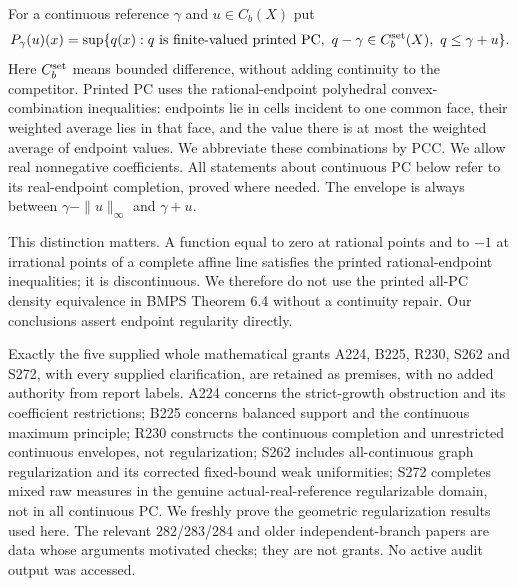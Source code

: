 \documentclass[11pt]{article}
\theoremstyle{definition}\newtheorem{definition}[theorem]{Definition}
\theoremstyle{remark}\newtheorem{remark}[theorem]{Remark}
\begin{document}
For a continuous reference $\gamma$ and $u\in C_b(X)$ put
\[
 P_\gamma(u)(x)=\sup\{q(x):q\text{ is finite-valued printed PC},\ q-\gamma\in C_b^{\rm set}(X),\ q\leq\gamma+u\}.
\]
Here $C_b^{\rm set}$ means bounded difference, without adding continuity to the competitor. Printed PC uses the rational-endpoint polyhedral convex-combination inequalities: endpoints lie in cells incident to one common face, their weighted average lies in that face, and the value there is at most the weighted average of endpoint values. We abbreviate these combinations by PCC. We allow real nonnegative coefficients. All statements about continuous PC below refer to its real-endpoint completion, proved where needed. The envelope is always between $\gamma-\|u\|_\infty$ and $\gamma+u$.

This distinction matters. A function equal to zero at rational points and to $-1$ at irrational points of a complete affine line satisfies the printed rational-endpoint inequalities; it is discontinuous. We therefore do not use the printed all-PC density equivalence in BMPS Theorem 6.4 without a continuity repair. Our conclusions assert endpoint regularity directly.

Exactly the five supplied whole mathematical grants A224, B225, R230, S262 and S272, with every supplied clarification, are retained as premises, with no added authority from report labels. A224 concerns the strict-growth obstruction and its coefficient restrictions; B225 concerns balanced support and the continuous maximum principle; R230 constructs the continuous completion and unrestricted continuous envelopes, not regularization; S262 includes all-continuous graph regularization and its corrected fixed-bound weak uniformities; S272 completes mixed raw measures in the genuine actual-real-reference regularizable domain, not in all continuous PC. We freshly prove the geometric regularization results used here. The relevant 282/283/284 and older independent-branch papers are data whose arguments motivated checks; they are not grants. No active audit output was accessed.
\end{document}

